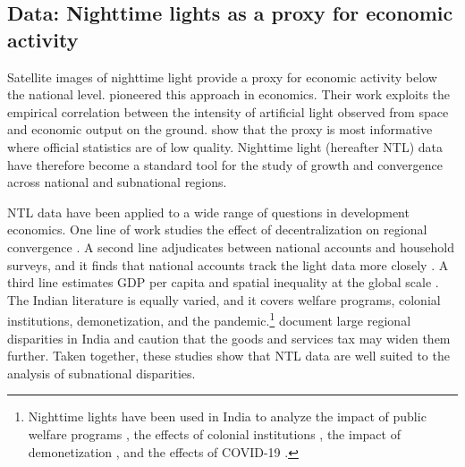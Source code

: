 \documentclass[
  a4paper, 
  twoside,
  final
]{article}
\begin{document}
\subsection{Data: Nighttime lights as a proxy for economic
activity}\label{data-nighttime-lights-as-a-proxy-for-economic-activity}

Satellite images of nighttime light provide a proxy for economic
activity below the national level.
\citet{henderson_storeygard_weil_lights} pioneered this approach in
economics. Their work exploits the empirical correlation between the
intensity of artificial light observed from space and economic output on
the ground. \citet{chen_nordhaus_luminosity_gdp} show that the proxy is
most informative where official statistics are of low quality. Nighttime
light (hereafter NTL) data have therefore become a standard tool for the
study of growth and convergence across national and subnational regions.

NTL data have been applied to a wide range of questions in development
economics. One line of work studies the effect of decentralization on
regional convergence \citep{adhikari_dhital_decentralization}. A second
line adjudicates between national accounts and household surveys, and it
finds that national accounts track the light data more closely
\citep{pinkovskiy_salaimartin_lights_poverty}. A third line estimates
GDP per capita and spatial inequality at the global scale
\citep{lessmann_seidel_regional_inequality}. The Indian literature is
equally varied, and it covers welfare programs, colonial institutions,
demonetization, and the pandemic.\footnote{Nighttime lights have been
  used in India to analyze the impact of public welfare programs
  \citep{cook_shah_nregs}, the effects of colonial institutions
  \citep{jha_talathi_colonial_india}, the impact of demonetization
  \citep{chanda_cook_demonetization}, and the effects of COVID-19
  \citep{beyer_jain_sinha_covid}.} \citet{chakravarty_dehejia_gst}
document large regional disparities in India and caution that the goods
and services tax may widen them further. Taken together, these studies
show that NTL data are well suited to the analysis of subnational
disparities.
\end{document}

